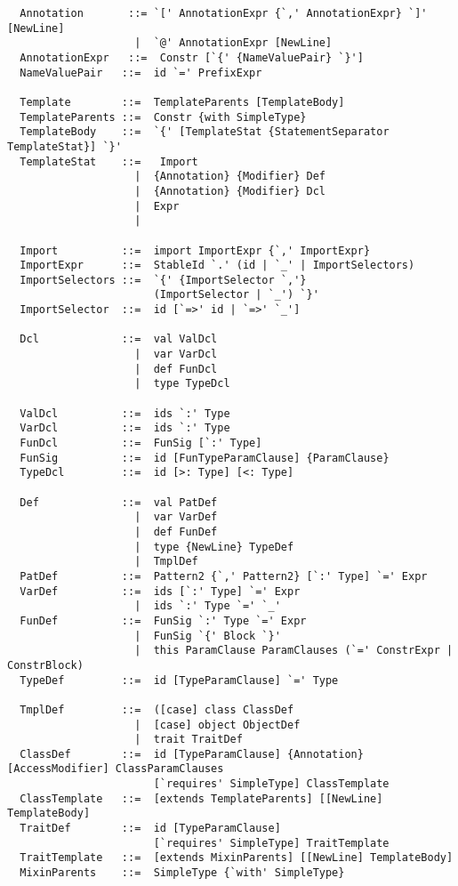\begin{lstlisting}
  Annotation       ::= `[' AnnotationExpr {`,' AnnotationExpr} `]' [NewLine]
                    |  `@' AnnotationExpr [NewLine]
  AnnotationExpr   ::=  Constr [`{' {NameValuePair} `}']
  NameValuePair   ::=  id `=' PrefixExpr

  Template        ::=  TemplateParents [TemplateBody]
  TemplateParents ::=  Constr {with SimpleType}
  TemplateBody    ::=  `{' [TemplateStat {StatementSeparator TemplateStat}] `}'
  TemplateStat    ::=   Import
                    |  {Annotation} {Modifier} Def
                    |  {Annotation} {Modifier} Dcl
                    |  Expr
                    |

  Import          ::=  import ImportExpr {`,' ImportExpr}
  ImportExpr      ::=  StableId `.' (id | `_' | ImportSelectors)
  ImportSelectors ::=  `{' {ImportSelector `,'} 
                       (ImportSelector | `_') `}'
  ImportSelector  ::=  id [`=>' id | `=>' `_']

  Dcl             ::=  val ValDcl
                    |  var VarDcl
                    |  def FunDcl
                    |  type TypeDcl

  ValDcl          ::=  ids `:' Type
  VarDcl          ::=  ids `:' Type
  FunDcl          ::=  FunSig [`:' Type]
  FunSig          ::=  id [FunTypeParamClause] {ParamClause}
  TypeDcl         ::=  id [>: Type] [<: Type]

  Def             ::=  val PatDef
                    |  var VarDef
                    |  def FunDef
                    |  type {NewLine} TypeDef
                    |  TmplDef
  PatDef          ::=  Pattern2 {`,' Pattern2} [`:' Type] `=' Expr
  VarDef          ::=  ids [`:' Type] `=' Expr
                    |  ids `:' Type `=' `_'
  FunDef          ::=  FunSig `:' Type `=' Expr
                    |  FunSig `{' Block `}'
                    |  this ParamClause ParamClauses (`=' ConstrExpr | ConstrBlock)
  TypeDef         ::=  id [TypeParamClause] `=' Type

  TmplDef         ::=  ([case] class ClassDef
                    |  [case] object ObjectDef
                    |  trait TraitDef
  ClassDef        ::=  id [TypeParamClause] {Annotation} [AccessModifier] ClassParamClauses
                       [`requires' SimpleType] ClassTemplate 
  ClassTemplate   ::=  [extends TemplateParents] [[NewLine] TemplateBody]
  TraitDef        ::=  id [TypeParamClause]
                       [`requires' SimpleType] TraitTemplate
  TraitTemplate   ::=  [extends MixinParents] [[NewLine] TemplateBody]
  MixinParents    ::=  SimpleType {`with' SimpleType}
  

\end{lstlisting}
